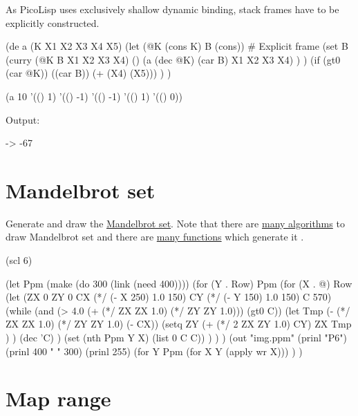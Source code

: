 \begin{wideverbatim}

As PicoLisp uses exclusively shallow dynamic binding, stack frames have to be
explicitly constructed.

(de a (K X1 X2 X3 X4 X5)
   (let (@K (cons K)  B (cons))  # Explicit frame
      (set B
         (curry (@K B X1 X2 X3 X4) ()
            (a (dec @K) (car B) X1 X2 X3 X4) ) )
      (if (gt0 (car @K)) ((car B)) (+ (X4) (X5))) ) )

(a 10 '(() 1) '(() -1) '(() -1) '(() 1) '(() 0))

Output:

-> -67

\end{wideverbatim}

\pagebreak{}
\section*{Mandelbrot set}

Generate and draw the
\href{http://en.wikipedia.org/wiki/Mandelbrot\_set}{Mandelbrot set}.
Note that there are
\href{http://en.wikibooks.org/wiki/Fractals/Iterations\_in\_the\_complex\_plane/Mandelbrot\_set}{many
algorithms} to draw Mandelbrot set and there are
\href{http://en.wikibooks.org/wiki/Pictures\_of\_Julia\_and\_Mandelbrot\_sets}{many
functions} which generate it .

\begin{wideverbatim}

(scl 6)

(let Ppm (make (do 300 (link (need 400))))
   (for (Y . Row) Ppm
      (for (X . @) Row
         (let (ZX 0  ZY 0  CX (*/ (- X 250) 1.0 150)  CY (*/ (- Y 150) 1.0 150)  C 570)
            (while (and (> 4.0 (+ (*/ ZX ZX 1.0) (*/ ZY ZY 1.0))) (gt0 C))
               (let Tmp (- (*/ ZX ZX 1.0) (*/ ZY ZY 1.0) (- CX))
                  (setq
                     ZY (+ (*/ 2 ZX ZY 1.0) CY)
                     ZX Tmp ) )
               (dec 'C) )
            (set (nth Ppm Y X) (list 0 C C)) ) ) )
   (out "img.ppm"
      (prinl "P6")
      (prinl 400 " " 300)
      (prinl 255)
      (for Y Ppm (for X Y (apply wr X))) ) )

\end{wideverbatim}

\pagebreak{}
\section*{Map range}

